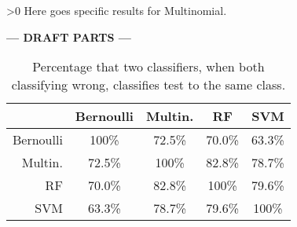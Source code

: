\ifnum\printdraft>0
	Here goes specific results for Multinomial.
\else
\begin{center}
  	\textbf{--- DRAFT PARTS ---}
\end{center}
\fi

\begin{table}[h]\footnotesize
	\caption{Percentage that two classifiers, when both classifying wrong, classifies test to the same class.}
	\begin{tabular}{r|cccc}
	\ 		 	& Bernoulli & Multin. 	&RF 		&SVM \\ \hline
	Bernoulli 	&100\%   	&72.5\%   	&70.0\%   	&63.3\%\\
	Multin. 	&72.5\%  	&100\%   	&82.8\%   	&78.7\%\\
	RF 			&70.0\%   	&82.8\%  	&100\%   	&79.6\%\\
	SVM 		&63.3\%   	&78.7\%   	&79.6\%  	&100\%
	\end{tabular}
\end{table}
